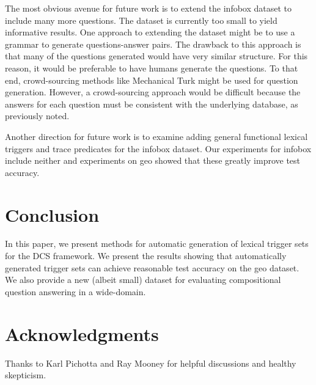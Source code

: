 \documentclass[11pt]{article}
\begin{document}
The most obvious avenue for future work is to extend the {\sc infobox} dataset
to include many more questions.
The dataset is currently too small to yield informative results. One approach to
extending the dataset might be to use a grammar to generate questions-answer
pairs. The drawback to this approach is that many of the questions generated would 
have very similar structure. For this reason, it would be preferable to have
humans generate the questions. To that end, crowd-sourcing methods like
Mechanical Turk might be used for question generation. However, a crowd-sourcing
approach would be difficult because the answers for each question must be
consistent with the underlying database, as previously noted. 

Another direction for future work is to examine adding general functional
lexical triggers and trace predicates for the {\sc infobox} dataset. Our 
experiments for {\sc infobox} include neither and  experiments
on {\sc geo} showed that these greatly improve test accuracy.  

\section{Conclusion}

In this paper, we present methods for automatic generation of lexical trigger
sets for the DCS framework. We present the results showing that automatically
generated trigger sets can achieve reasonable test accuracy on the {\sc geo}
dataset. We also provide a new (albeit small) dataset for evaluating 
compositional question answering in a wide-domain. 

\section*{Acknowledgments}

Thanks to Karl Pichotta and Ray Mooney for helpful discussions and healthy
skepticism.




\end{document}

